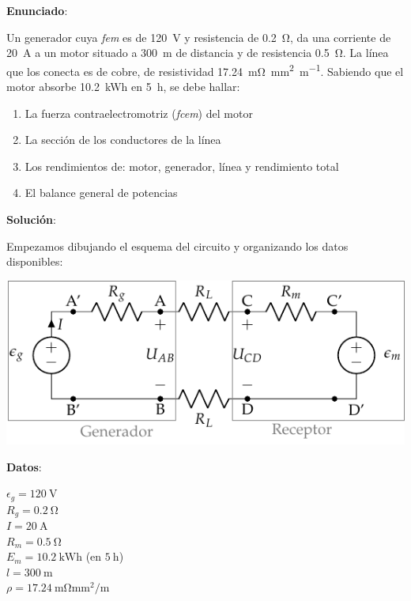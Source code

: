 \documentclass[10pt]{article}
\begin{document}
\large{\textbf{Enunciado}}:

\vspace{3mm}
Un generador cuya \textit{fem} es de \qty{120}{\volt} y resistencia de \qty{0.2}{\ohm}, da una corriente de \qty{20}{\ampere} a un motor situado a \qty{300}{\meter} de distancia y de resistencia \qty{0.5}{\ohm}. La línea que los conecta es de cobre, de resistividad \qty{17.24}{\milli\ohm\milli\meter\squared\per\meter}. Sabiendo que el motor absorbe \qty{10.2}{\kWh} en \qty{5}{\hour}, se debe hallar:
\vspace{3mm}

\begin{enumerate}
    \item La fuerza contraelectromotriz (\textit{fcem}) del motor
    \item La sección de los conductores de la línea
    \item Los rendimientos de: motor, generador, línea y rendimiento total
    \item El balance general de potencias
\end{enumerate}


\hrulefill

\vspace{5mm}
\textbf{Solución}:
\vspace{4mm}

Empezamos dibujando el esquema del circuito y organizando los datos disponibles:
\vspace{6mm}

\begin{minipage}{0.73\linewidth}
  \includegraphics[scale=1.25]{../figs/circuito_lkv.pdf}
\end{minipage}
\begin{minipage}{0.27\linewidth}
  \textbf{Datos}:
  \vspace{2mm}
  
  $\epsilon_g = \qty{120}{\volt}$\\
  $R_g = \qty{0.2}{\ohm}$\\
  $I = \qty{20}{\ampere}$\\
  $R_m = \qty{0.5}{\ohm}$\\
  $E_m = \qty{10.2}{\kWh}$ (en $\qty{5}{\hour}$)\\
  $l = \qty{300}{\meter}$\\
  $\rho = \qty{17.24}{\milli\ohm\milli\meter\squared\per\meter}$
\end{minipage}
\end{document}
